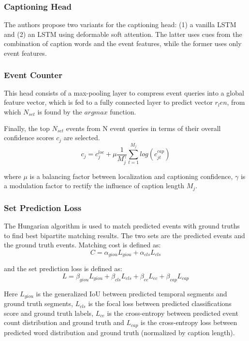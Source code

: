 \subsubsection{Captioning Head} The authors propose two variants for the captioning head: (1) a vanilla LSTM and (2) an LSTM using deformable soft attention. The latter uses cues from the combination of caption words and the event features, while the former uses only event features.

\subsubsection{Event Counter} This head consists of a max-pooling layer to compress event queries into a global feature vector, which is fed to a fully connected layer to predict vector $r_len$, from which $N_{set}$ is found by the $argmax$ function. 

Finally, the top $N_{set}$ events from N event queries in terms of their overall confidence scores $c_j$ are selected.
$$ c_j = c_j^{loc} + \mu \frac{1}{M_j^{\gamma}} \sum_{t=1}^{M_j}{log( c^{cap}_{jt} )} $$
\par where $\mu$ is a balancing factor between localization and captioning confidence, $\gamma$ is a modulation factor to rectify the influence of caption length $M_j$.


\subsubsection{Set Prediction Loss}
\par The Hungarian algorithm is used to match predicted events with ground truths to find best bipartite matching results. The two sets are the predicted events and the ground truth events. Matching cost is defined as:
$$ C = \alpha_{giou} L_{giou} + \alpha_{cls} L_{cls} $$
\par and the set prediction loss is defined as:
$$ L = \beta_{giou} L_{giou} + \beta_{cls} L_{cls}  + \beta_{ec} L_{ec} + \beta_{cap} L_{cap}$$

\par Here $L_{giou}$ is the generalized IoU between predicted temporal segments and ground truth segments, $L_{cls}$ is the focal loss between predicted classifications score and ground truth labels, $L_{ce}$ is the cross-entropy between predicted event count distribution and ground truth and $L_{cap}$ is the cross-entropy loss between predicted word distribution and ground truth (normalized by caption length).
